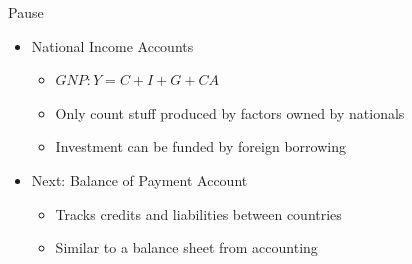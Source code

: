 \documentclass{beamer}
\begin{document}

\begin{frame}{Pause}
    \begin{itemize}
        \item National Income Accounts
        \begin{itemize}
            \item $GNP: Y = C + I + G + CA$
            \item Only count stuff produced by factors owned by nationals
            \item Investment can be funded by foreign borrowing
        \end{itemize}
        \item Next: Balance of Payment Account
        \begin{itemize}
            \item Tracks credits and liabilities between countries 
            \item Similar to a balance sheet from accounting
        \end{itemize}
    \end{itemize}
\end{frame}
\end{document}
